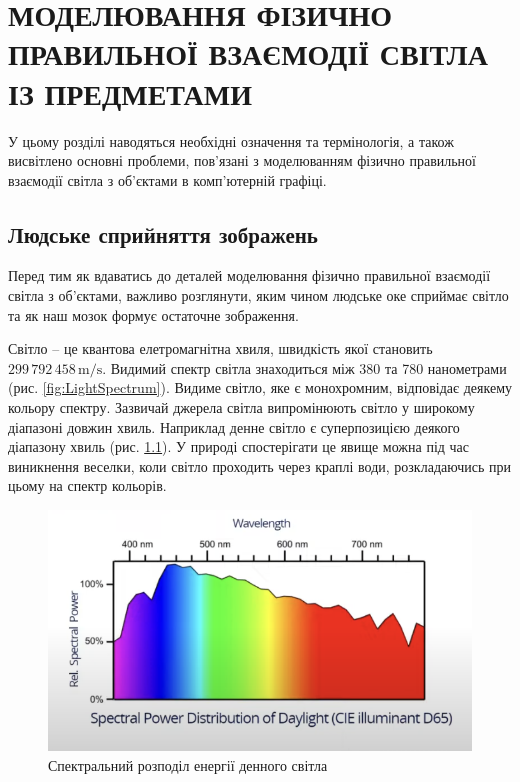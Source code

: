 

 \chapter{МОДЕЛЮВАННЯ ФІЗИЧНО ПРАВИЛЬНОЇ ВЗАЄМОДІЇ СВІТЛА ІЗ ПРЕДМЕТАМИ}

 
 \par У цьому розділі наводяться необхідні означення та термінологія, а також висвітлено основні проблеми, пов'язані з моделюванням фізично правильної взаємодії світла з 
      об'єктами в комп'ютерній графіці. 

 \section{Людське сприйняття зображень}
  \setcounter{equation}{0}
 \setcounter{theorem}{0}

 \par Перед тим як вдаватись до деталей моделювання фізично правильної взаємодії світла з об'єктами, важливо розглянути, 
 яким чином людське оке сприй\-має світло та як наш мозок формує остаточне зображення.
 \par Світло -- це квантова елетромагнітна хвиля, швидкість якої становить \break $299\,792\,458\,\text{m/s}$. Видимий спектр світла знаходиться між 
 380 та 780 наномет\-рами (рис. \ref{fig:LightSpectrum}). Видиме світло, яке є монохромним, відповідає деякему кольору спектру. Зазвичай джерела світла випромінюють 
 світло у широкому діапазоні довжин хвиль. Наприклад денне світло є суперпозицією деякого діапазону хвиль (рис. \ref{fig:LightSuper}).
У природі спостерігати це явище можна під час виникнення веселки, коли світло проходить через краплі води, розкладаючись при цьому на спектр кольорів.

 \begin{figure}[h]
  \centering
  \includegraphics[scale=1]{Pictures/LightSuper.png}
  \caption{Спектральний розподіл енергії денного світла}
  \label{fig:LightSuper}
\end{figure}

